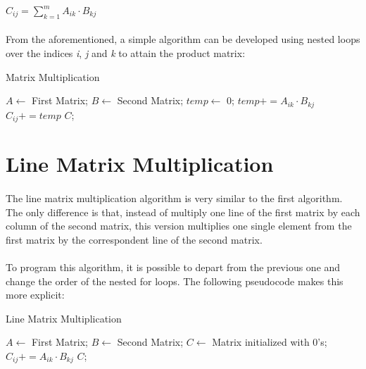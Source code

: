 \documentclass{report}
\begin{document}
			\begin{center}
				$C_{ij} = \sum_{k=1}^{m} A_{ik} \cdot B_{kj}$
			\end{center}
		
			\paragraph{} From the aforementioned, a simple algorithm can be developed using nested loops over the indices \emph{i}, \emph{j} and \emph{k} to attain the product matrix:
			
			\begin{algorithm}[H]
				\caption{Matrix Multiplication} 
				\begin{algorithmic}[1]
					\State$A\gets $ First Matrix; $B\gets $ Second Matrix;
							\State $temp\gets $ 0;
								\State $temp += A_{ik} \cdot B_{kj}$
							\EndFor
							\State $C_{ij} += temp$
						\EndFor
					\EndFor
					\State\Return $C$;
				\end{algorithmic} 
			\end{algorithm}
		
		\section{Line Matrix Multiplication}
		
			\paragraph{} The line matrix multiplication algorithm is very similar to the first algorithm. The only difference is that, instead of multiply one line of the first matrix by each column of the second matrix, this version multiplies one single element from the first matrix by the correspondent line of the second matrix. 
			
			\paragraph{} To program this algorithm, it is possible to depart from the previous one and change the order of the nested for loops. The following pseudocode makes this more explicit:
			
			\begin{algorithm}[H]
				\caption{Line Matrix Multiplication} 
				\begin{algorithmic}[1]
					\State$A\gets $ First Matrix; $B\gets $ Second Matrix;
					\State$C\gets $ Matrix initialized with 0's;
								\State $C_{ij} += A_{ik} \cdot B_{kj}$
							\EndFor
						\EndFor
					\EndFor
					\State\Return $C$;
				\end{algorithmic} 
			\end{algorithm}
		
\end{document}
